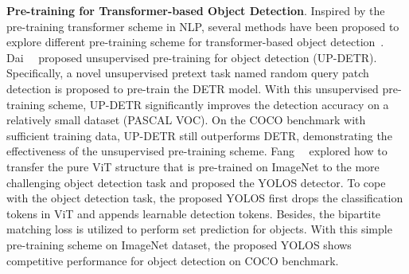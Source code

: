 \noindent\textbf{Pre-training for Transformer-based Object Detection}.
Inspired by the pre-training transformer scheme in NLP, several methods have been proposed to explore different pre-training scheme for transformer-based object detection~. Dai~\etal~ proposed unsupervised pre-training for object detection (UP-DETR). Specifically, a novel unsupervised pretext task named random query patch detection is proposed to pre-train the DETR model. With this unsupervised pre-training scheme, UP-DETR significantly improves the detection accuracy on a relatively small dataset (PASCAL VOC). On the COCO benchmark with sufficient training data, UP-DETR still outperforms DETR, demonstrating the effectiveness of the unsupervised pre-training scheme.
Fang~\etal~ explored how to transfer the pure ViT structure that is pre-trained on ImageNet to the more challenging object detection task and proposed the YOLOS detector. To cope with the object detection task, the proposed YOLOS first drops the classification tokens in ViT and appends learnable detection tokens. Besides, the bipartite matching loss is utilized to perform set prediction for objects. With this simple pre-training scheme on ImageNet dataset, the proposed YOLOS shows competitive performance for object detection on COCO benchmark.

